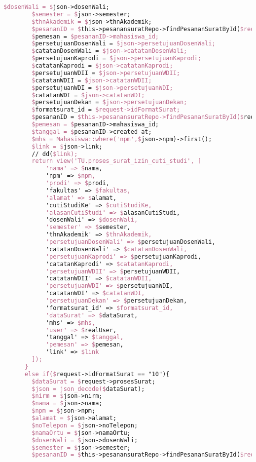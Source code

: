 \begin{lstlisting}[language=tex,basicstyle=\tiny,caption=PesanansuratController.php]
        $dosenWali = $json->dosenWali;
        $semester = $json->semester;
        $thnAkademik = $json->thnAkademik;
        $pesananID = $this->pesanansuratRepo->findPesananSuratById($request->id);
        $pemesan = $pesananID->mahasiswa_id;
        $persetujuanDosenWali = $json->persetujuanDosenWali;
        $catatanDosenWali = $json->catatanDosenWali;
        $persetujuanKaprodi = $json->persetujuanKaprodi;
        $catatanKaprodi = $json->catatanKaprodi;
        $persetujuanWDII = $json->persetujuanWDII;
        $catatanWDII = $json->catatanWDII;
        $persetujuanWDI = $json->persetujuanWDI;
        $catatanWDI = $json->catatanWDI;
        $persetujuanDekan = $json->persetujuanDekan;
        $formatsurat_id = $request->idFormatSurat;
        $pesananID = $this->pesanansuratRepo->findPesananSuratById($request->id);
        $pemesan = $pesananID->mahasiswa_id;
        $tanggal = $pesananID->created_at;
        $mhs = Mahasiswa::where('npm',$json->npm)->first();
        $link = $json->link;
        // dd($link);
        return view('TU.proses_surat_izin_cuti_studi', [
            'nama' => $nama,
            'npm' => $npm,
            'prodi' => $prodi,
            'fakultas' => $fakultas,
            'alamat' => $alamat,
            'cutiStudiKe' => $cutiStudiKe,
            'alasanCutiStudi' => $alasanCutiStudi,
            'dosenWali' => $dosenWali,
            'semester' => $semester,
            'thnAkademik' => $thnAkademik,
            'persetujuanDosenWali' => $persetujuanDosenWali,
            'catatanDosenWali' => $catatanDosenWali,
            'persetujuanKaprodi' => $persetujuanKaprodi,
            'catatanKaprodi' => $catatanKaprodi,
            'persetujuanWDII' => $persetujuanWDII,
            'catatanWDII' => $catatanWDII,
            'persetujuanWDI' => $persetujuanWDI,
            'catatanWDI' => $catatanWDI,
            'persetujuanDekan' => $persetujuanDekan,
            'formatsurat_id' => $formatsurat_id,
            'dataSurat' => $dataSurat,
            'mhs' => $mhs,
            'user' => $realUser,
            'tanggal' => $tanggal,
            'pemesan' => $pemesan,
            'link' => $link
        ]);
      }
      else if($request->idFormatSurat == "10"){
        $dataSurat = $request->prosesSurat;
        $json = json_decode($dataSurat);
        $nirm = $json->nirm;
        $nama = $json->nama;
        $npm = $json->npm;
        $alamat = $json->alamat;
        $noTelepon = $json->noTelepon;
        $namaOrtu = $json->namaOrtu;
        $dosenWali = $json->dosenWali;
        $semester = $json->semester;
        $pesananID = $this->pesanansuratRepo->findPesananSuratById($request->id);

\end{lstlisting}
